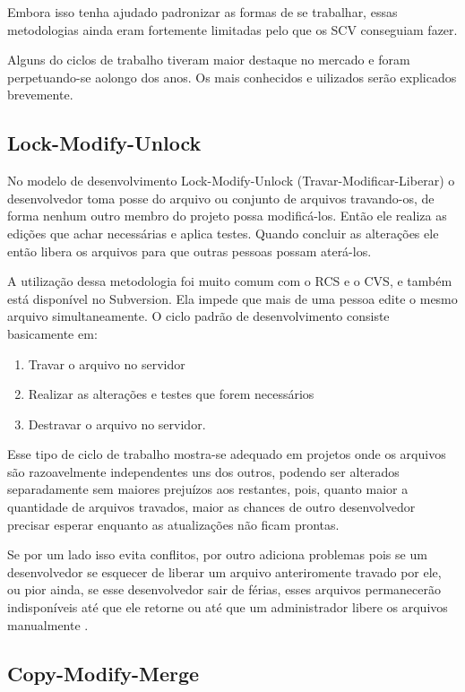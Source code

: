 Embora isso tenha ajudado padronizar as formas de se trabalhar, essas metodologias ainda eram fortemente limitadas pelo que os SCV conseguiam fazer.

Alguns do ciclos de trabalho tiveram maior destaque no mercado e foram perpetuando-se aolongo dos anos. Os mais conhecidos e uilizados serão explicados brevemente.


\subsection{Lock-Modify-Unlock}

No modelo de desenvolvimento Lock-Modify-Unlock (Travar-Modificar-Liberar) o desenvolvedor toma posse do arquivo ou conjunto de arquivos travando-os, de forma nenhum outro membro do projeto possa modificá-los. Então ele realiza as edições que achar necessárias e aplica testes. Quando concluir as alterações ele então libera os arquivos para que outras pessoas possam aterá-los.

A utilização dessa metodologia foi muito comum com o RCS e o CVS, e também está  disponível no Subversion. Ela impede que mais de uma pessoa edite o mesmo arquivo simultaneamente. O ciclo padrão de desenvolvimento consiste basicamente em:

\begin{enumerate}
\item Travar o arquivo no servidor
\item Realizar as alterações e testes que forem necessários
\item Destravar o arquivo no servidor.
\end{enumerate}

Esse tipo de ciclo de trabalho mostra-se adequado em projetos onde os arquivos são razoavelmente independentes uns dos outros, podendo ser alterados separadamente sem maiores prejuízos aos restantes, pois, quanto maior a quantidade de arquivos travados, maior as chances de outro desenvolvedor precisar esperar enquanto as atualizações não ficam prontas.

Se por um lado isso evita conflitos, por outro adiciona problemas pois se um desenvolvedor se esquecer de liberar um arquivo anteriromente travado por ele, ou pior ainda, se esse desenvolvedor sair de férias, esses arquivos permanecerão indisponíveis até que ele retorne ou até que um administrador libere os arquivos manualmente \cite{Sussman}.

\subsection{Copy-Modify-Merge}

